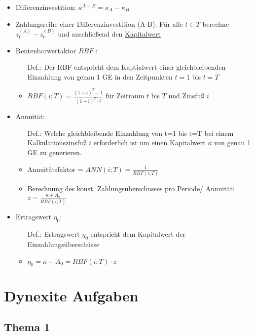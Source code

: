 \documentclass[12pt]{article}
\begin{document}
\begin{itemize}
		\item Differenzinvestition: $\kappa^{A-B}=\kappa_A - \kappa_B$
		\item Zahlungsreihe einer Differenzinvestition (A-B): Für alle $t\in T$ berechne $z_t^{(A)}-z_t^{(B)}$ und anschließend den \hyperref[Kapitalwert]{Kapitalwert} \label{ZahlungsreiheEinerDifferenzinvestition}
		\item Rentenbarwertaktor $RBF$ \label{Rentenbarwertfaktor}:
			\begin{itemize}
				\item[Def.:] Der RBF entspricht dem Kaptialwert einer gleichbleibenden Einzahlung von genau 1 GE in den Zeitpunkten $t=1$ bis $t=T$
				\item $RBF(i;T)=\frac{(1+i)^T-1}{(1+i)^T\cdot i}$ für Zeitraum $t$ bis $T$ und Zinsfuß $i$ 
			\end{itemize}
		\item Annuität:\label{Annuitaet}
			\begin{itemize}
				\item[Def.:] Welche gleichbleibende Einzahlung von t=1 bis t=T bei einem Kalkulationszinsfuß $i$ erforderlich ist um einen Kapitalwert $\kappa$ von genau 1 GE zu generieren.
				\item Annuitätsfaktor = $ANN(i;T)=\frac{1}{RBF(i;T)}$ 
				\item Berechnung des konst. Zahlungsüberschusses pro Periode/ Annuität: $z=\frac{\kappa + A_0}{RBF(i;T)}$
			\end{itemize}
		\item Ertragswert $\eta_0$:
			\begin{itemize}
				\item[Def.:] Ertragswert $\eta_0$ entspricht dem Kapitalwert der Einzahlungsüberschüsse
				\item $\eta_0=\kappa-A_0 = RBF(i;T)\cdot z $
			\end{itemize}
	\end{itemize}
	\section{Dynexite Aufgaben}
	\subsection*{Thema 1}
\end{document}
